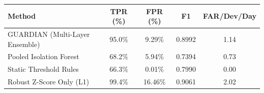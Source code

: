 \begin{tabular}{lcccc}
\toprule
\textbf{Method} & \textbf{TPR (\%)} & \textbf{FPR (\%)} & \textbf{F1} & \textbf{FAR/Dev/Day} \\
\midrule
GUARDIAN (Multi-Layer Ensemble) & 95.0\% & 9.29\% & 0.8992 & 1.14 \\
Pooled Isolation Forest & 68.2\% & 5.94\% & 0.7394 & 0.73 \\
Static Threshold Rules & 66.3\% & 0.01\% & 0.7990 & 0.00 \\
Robust Z-Score Only (L1) & 99.4\% & 16.46\% & 0.9061 & 2.02 \\
\bottomrule
\end{tabular}